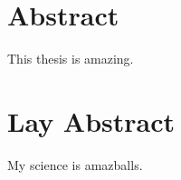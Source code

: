 \documentclass[../main.tex]{subfiles}
\begin{document}
\chapter*{Abstract}
This thesis is amazing.

\chapter*{Lay Abstract}
My science is amazballs.
\end{document}
